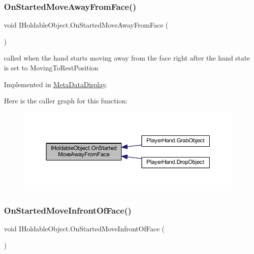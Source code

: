 \subsubsection{\texorpdfstring{On\+Started\+Move\+Away\+From\+Face()}{OnStartedMoveAwayFromFace()}}
{\footnotesize\ttfamily void I\+Holdable\+Object.\+On\+Started\+Move\+Away\+From\+Face (\begin{DoxyParamCaption}{ }\end{DoxyParamCaption})}



called when the hand starts moving away from the face right after the hand state is set to Moving\+To\+Rest\+Position 



Implemented in \mbox{\hyperlink{class_meta_data_display_a98518b3d82ffd1e428cab9a2328fb018}{Meta\+Data\+Display}}.

Here is the caller graph for this function\+:\nopagebreak
\begin{figure}[H]
\begin{center}
\leavevmode
\includegraphics[width=350pt]{interface_i_holdable_object_a75f802a9736db51e5e8d1568689dd11c_icgraph}
\end{center}
\end{figure}
\mbox{\label{interface_i_holdable_object_af5dcdd5524539104706dadd8a0e15e08}} 
\subsubsection{\texorpdfstring{On\+Started\+Move\+Infront\+Of\+Face()}{OnStartedMoveInfrontOfFace()}}
{\footnotesize\ttfamily void I\+Holdable\+Object.\+On\+Started\+Move\+Infront\+Of\+Face (\begin{DoxyParamCaption}{ }\end{DoxyParamCaption})}




